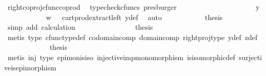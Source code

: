 \begin{isabellebody}
\ right{\isacharunderscore}{\kern0pt}coproj{\isacharunderscore}{\kern0pt}cfunc{\isacharunderscore}{\kern0pt}coprod\ \isamarkupfalse%
\ {\isacharparenleft}{\kern0pt}typecheck{\isacharunderscore}{\kern0pt}cfuncs{\isacharcomma}{\kern0pt}\ presburger{\isacharparenright}{\kern0pt}\ \ \ \ \ \ \ \ \isanewline
\ \ \ \ \ \ \ \ \isamarkupfalse%
\ \isamarkupfalse%
\ {\isachardoublequoteopen}{\isachardot}{\kern0pt}{\isachardot}{\kern0pt}{\isachardot}{\kern0pt}\ {\isacharequal}{\kern0pt}\ y{\isachardoublequoteclose}\isanewline
\ \ \ \ \ \ \ \ \ \ \isamarkupfalse%
\ {\isacartoucheopen}w\ {\isacharequal}{\kern0pt}\ {\isasymf}{\isacartoucheclose}\ cart{\isacharunderscore}{\kern0pt}prod{\isacharunderscore}{\kern0pt}extract{\isacharunderscore}{\kern0pt}left\ y{\isacharunderscore}{\kern0pt}def\ \isamarkupfalse%
\ auto\isanewline
\ \ \ \ \ \ \ \ \isamarkupfalse%
\ \isamarkupfalse%
\ {\isacharquery}{\kern0pt}thesis\isanewline
\ \ \ \ \ \ \ \ \ \ \isamarkupfalse%
\ {\isacharparenleft}{\kern0pt}simp\ add{\isacharcolon}{\kern0pt}\ calculation{\isacharparenright}{\kern0pt}\isanewline
\ \ \ \ \ \ \isamarkupfalse%
\isanewline
\ \ \ \ \ \ \isamarkupfalse%
\ \isamarkupfalse%
\ {\isacharquery}{\kern0pt}thesis\isanewline
\ \ \ \ \ \ \ \ \isamarkupfalse%
\ {\isacharparenleft}{\kern0pt}metis\ {\isasymrho}{\isacharunderscore}{\kern0pt}type\ cfunc{\isacharunderscore}{\kern0pt}type{\isacharunderscore}{\kern0pt}def\ codomain{\isacharunderscore}{\kern0pt}comp\ domain{\isacharunderscore}{\kern0pt}comp\ right{\isacharunderscore}{\kern0pt}proj{\isacharunderscore}{\kern0pt}type\ y{\isacharunderscore}{\kern0pt}def\ z{\isacharunderscore}{\kern0pt}def{\isacharparenright}{\kern0pt}\isanewline
\ \ \ \ \isamarkupfalse%
\isanewline
\ \ \isamarkupfalse%
\isanewline
\ \ \isamarkupfalse%
\ \isamarkupfalse%
\ {\isacharquery}{\kern0pt}thesis\isanewline
\ \ \ \ \isamarkupfalse%
\ {\isacharparenleft}{\kern0pt}metis\ {\isasymrho}{\isacharunderscore}{\kern0pt}inj\ {\isasymrho}{\isacharunderscore}{\kern0pt}type\ epi{\isacharunderscore}{\kern0pt}mon{\isacharunderscore}{\kern0pt}is{\isacharunderscore}{\kern0pt}iso\ injective{\isacharunderscore}{\kern0pt}imp{\isacharunderscore}{\kern0pt}monomorphism\ is{\isacharunderscore}{\kern0pt}isomorphic{\isacharunderscore}{\kern0pt}def\ surjective{\isacharunderscore}{\kern0pt}is{\isacharunderscore}{\kern0pt}epimorphism{\isacharparenright}{\kern0pt}\isanewline

\end{isabellebody}
